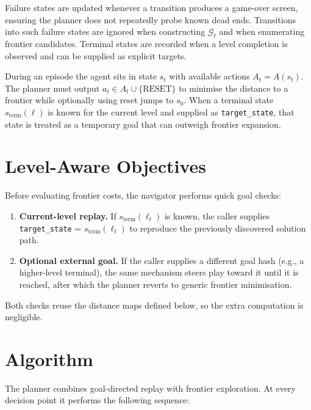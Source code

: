 \documentclass[11pt]{article}
\begin{document}
Failure states are updated whenever a transition produces a game-over screen, ensuring the planner does not repeatedly probe known dead ends. Transitions into such failure states are ignored when constructing $\mathcal{G}_t$ and when enumerating frontier candidates. Terminal states are recorded when a level completion is observed and can be supplied as explicit targets.

During an episode the agent sits in state $s_t$ with available actions $A_t = A(s_t)$. The planner must output $a_t \in A_t \cup \{\mathrm{RESET}\}$ to minimise the distance to a frontier while optionally using reset jumps to $s_0$. When a terminal state $s_{\mathrm{term}}(\ell)$ is known for the current level and supplied as \texttt{target\_state}, that state is treated as a temporary goal that can outweigh frontier expansion.

\section{Level-Aware Objectives}

Before evaluating frontier costs, the navigator performs quick goal checks:
\begin{enumerate}
    \item \textbf{Current-level replay.} If $s_{\mathrm{term}}(\ell_t)$ is known, the caller supplies \texttt{target\_state} = $s_{\mathrm{term}}(\ell_t)$ to reproduce the previously discovered solution path.
    \item \textbf{Optional external goal.} If the caller supplies a different goal hash (e.g., a higher-level terminal), the same mechanism steers play toward it until it is reached, after which the planner reverts to generic frontier minimisation.
\end{enumerate}
Both checks reuse the distance maps defined below, so the extra computation is negligible.

\section{Algorithm}

The planner combines goal-directed replay with frontier exploration. At every decision point it performs the following sequence:
\end{document}

